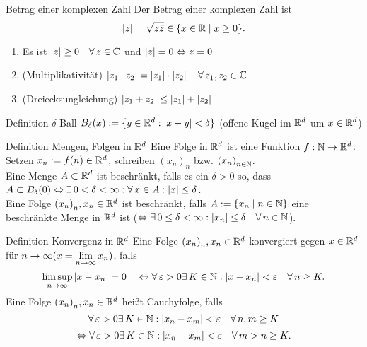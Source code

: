 \documentclass[main.tex]{subfiles}
\begin{document}
\begin{karte}{Betrag einer komplexen Zahl}
    Der Betrag einer komplexen Zahl ist
    \[ |z| = \sqrt{z \bar{z}}\in \{x\in\mathbb{R} \;\vert \; x\geq 0\}. \]
    \begin{enumerate}
        \item Es ist \( \abs{z} \geq 0 
        \quad \forall z\in\C \) und 
        \( \left| z \right| = 0 \Leftrightarrow z = 0 \)
        \item (Multiplikativität) 
        \( \abs{z_1 \cdot z_2} 
        = \abs{z_1} \cdot \abs{z_2} 
        \quad \forall z_1,z_2\in\C \)
        \item (Dreiecksungleichung) 
        \( \left| z_1 + z_2 \right| \leq \left| z_1 \right| + \left| z_2 \right| \)
	\end{enumerate}
\end{karte}
\begin{karte}{Definition \( \delta \)-Ball}
    \( B_\delta(x) := \{ y\in\mathbb{R}^d : \left| x-y \right| < \delta \} \) 
    (offene Kugel im \(\mathbb{R}^d\) um \( x\in\mathbb{R}^d \))
\end{karte}
\begin{karte}{Definition Mengen, Folgen in \( \mathbb{R}^d \)}
    Eine Folge in \( \mathbb{R}^d \) ist eine Funktion 
    \( f: \mathbb{N} \rightarrow \mathbb{R}^d \). 
    Setzen \(x_n := f(n)\in\mathbb{R}^d \), 
    schreiben \( {(x_n)}_n \) bzw. 
    \({(x_n)}_{n\in\mathbb{N}}\).\\
    Eine Menge \( A\subset \mathbb{R}^d \) 
    ist beschränkt, falls es ein 
    \( \delta > 0\) so, dass \( A\subset B_\delta(0) 
    \Leftrightarrow \exists 0<\delta<\infty:
    \forall x\in A: \abs{x}\leq \delta \).\\
    Eine Folge \( {(x_n)}_n, x_n\in\mathbb{R}^d \) 
    ist beschränkt, falls \(A := \{x_n \;\vert \; n\in\mathbb{N}\} \) 
    eine beschränkte Menge in \( \mathbb{R}^d \) ist 
    (\( \Leftrightarrow \exists 0\leq \delta < \infty: 
    \abs{x_n} \leq \delta \quad \forall n\in\N \)).\\
\end{karte}
\begin{karte}{Definition Konvergenz in \( \mathbb{R}^d \)}
    Eine Folge \( {(x_n)}_n, x_n\in\mathbb{R}^d \) 
    konvergiert gegen \( x\in\mathbb{R}^d \) für 
    \( n\rightarrow \infty (x=\lim\limits_{n\rightarrow\infty} x_n) \), falls 
    \[ \limsup\limits_{n\rightarrow\infty} |x-x_n| 
    = 0 \quad \Leftrightarrow \forall \varepsilon 
    > 0 \exists K\in\N: |x-x_n| < \varepsilon 
    \quad \forall n\geq K. \]
	Eine Folge \( {(x_n)}_n, x_n\in\mathbb{R}^d \) heißt Cauchyfolge, falls 
    \[ \forall \varepsilon>0 \exists K\in\N: 
    |x_n - x_m| < \varepsilon \quad \forall n,m\geq K \]
    \[ \Leftrightarrow \forall \varepsilon > 0 \exists K\in\N: 
    |x_n-x_m| < \varepsilon \quad \forall m>n\geq K. \]
\end{karte}
\end{document}

